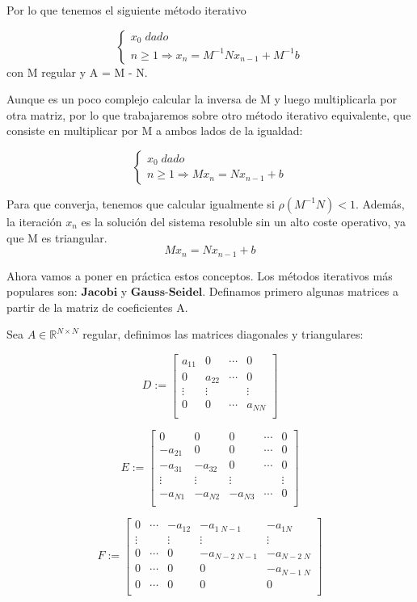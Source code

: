Por lo que tenemos el siguiente método iterativo

\[ \left\{ \begin{array}{c}
x_0 \; dado \\
n \geq 1 \Rightarrow x_n = M^{-1}Nx_{n-1} + M^{-1}b
\end{array}
\right. \]
con M regular y A = M - N.

Aunque es un poco complejo calcular la inversa de M y luego multiplicarla por otra matriz, por lo que trabajaremos sobre otro método iterativo equivalente, que consiste en multiplicar por M a ambos lados de la igualdad:

\[ \left\{ \begin{array}{c}
x_0 \; dado \\
n \geq 1 \Rightarrow Mx_n = Nx_{n-1} + b
\end{array}
\right. \]

Para que converja, tenemos que calcular igualmente si $\rho (M^{-1}N) < 1$. Además, la iteración $x_n$ es la solución del sistema resoluble sin un alto coste operativo, ya que M es triangular.
\[ Mx_n = Nx_{n-1} + b \]

Ahora vamos a poner en práctica estos conceptos. Los métodos iterativos más populares son: $\textbf{Jacobi}$ y $\textbf{Gauss-Seidel}$. Definamos primero algunas matrices a partir de la matriz de coeficientes A.

Sea $A \in \mathbb{R}^{N \times N}$ regular, definimos las matrices diagonales y triangulares:

\[ D := \begin{bmatrix}
a_{11} & 0 & \cdots & 0 \\
0 & a_{22} & \cdots & 0 \\
\vdots & \vdots & & \vdots \\
0 & 0 & \cdots & a_{NN} \\
\end{bmatrix} \]

\[ E := \begin{bmatrix}
0 & 0 & 0 & \cdots & 0 \\
-a_{21} & 0 & 0 & \cdots & 0 \\
-a_{31} & -a_{32} & 0 & \cdots & 0 \\
\vdots & \vdots & \vdots & & \vdots \\
-a_{N1} & -a_{N2} & -a_{N3} & \cdots & 0 \\
\end{bmatrix} \]

\[ F := \begin{bmatrix}
0 & \cdots & -a_{12} & -a_{1 \; N-1} & -a_{1N} \\
\vdots & & \vdots & \vdots & \vdots \\
0 & \cdots & 0 & -a_{N-2 \; N-1} & -a_{N-2 \; N} \\
0 & \cdots & 0 & 0 & -a_{N-1 \; N} \\
0 & \cdots & 0 & 0 & 0 \\
\end{bmatrix} \]

